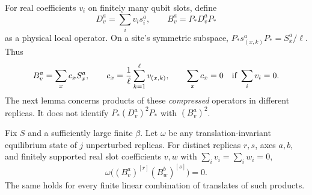For real coefficients $v_i$ on finitely many qubit slots, define
\[
 D_v^a=\sum_i v_i s_i^a,
 \qquad B_v^a=P_*D_v^aP_*
\]
as a physical local operator.  On a site's symmetric subspace,
$P_*s_{(x,k)}^aP_*=S_x^a/\ell$.  Thus
\begin{equation}\label{eq:compressed-zero-sum}
 B_v^a=\sum_x c_x S_x^a,
 \qquad c_x=\frac1\ell\sum_{k=1}^{\ell}v_{(x,k)},
 \qquad \sum_xc_x=0\quad\hbox{if }\sum_iv_i=0.
\end{equation}
The next lemma concerns products of these \emph{compressed} operators
in different replicas.  It does not identify $P_*(D_v^a)^2P_*$ with
$(B_v^a)^2$.

\begin{lemma}\label{lem:replica-cross}
Fix $S$ and a sufficiently large finite $\beta$.  Let $\omega$ be any
translation-invariant equilibrium state of $j$ unperturbed replicas.
For distinct replicas $r,s$, axes $a,b$, and finitely supported real
slot coefficients $v,w$ with $\sum_i v_i=\sum_i w_i=0$,
\[
 \omega\bigl((B_v^a)^{[r]}(B_w^b)^{[s]}\bigr)=0.
\]
The same holds for every finite linear combination of translates of
such products.
\end{lemma}

